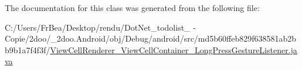 The documentation for this class was generated from the following file:\begin{CompactItemize}
\item 
C:/Users/FrBea/Desktop/rendu/DotNet\_\-todolist\_ - Copie/2doo/\_\-2doo.Android/obj/Debug/android/src/md5b60ffeb829f638581ab2bb9b1a7f4f3f/\hyperlink{_view_cell_renderer___view_cell_container___long_press_gesture_listener_8java}{ViewCellRenderer\_\-ViewCellContainer\_\-LongPressGestureListener.java}\end{CompactItemize}
